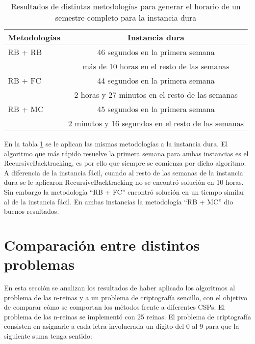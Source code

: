 \begin{table}[h]
	\caption{Resultados de distintas metodolog\'ias para generar el horario de un semestre completo para la instancia dura}
	\begin{center}
		\label{2semestre}
		\begin{tabular}{|l|c||}
			\hline \hline
			Metodolog\'ias & Instancia dura \\ \hline
			RB + RB & 46 segundos en la primera semana \\
			 &  m\'as de 10 horas en el resto de las semanas \\ \hline
			RB + FC & 44 segundos en la primera semana \\
			 & 2 horas y 27 minutos en el resto de las semanas \\ \hline
			RB + MC & 45 segundos en la primera semana \\
			 & 2 minutos y 16 segundos en el resto de las semanas \\ \hline
		\end{tabular}
	\end{center}
\end{table}

En la tabla \ref{2semestre} se le aplican las mismas metodolog\'ias a la instancia dura. El algoritmo que m\'as r\'apido resuelve la primera semana para ambas instancias es el \textsf{RecursiveBacktracking}, es por ello que siempre se comienza por dicho algoritmo. A diferencia de la instancia f\'acil, cuando al resto de las semanas de la instancia dura se le aplicaron \textsf{RecursiveBacktracking} no se encontr\'o soluci\'on en 10 horas. Sin embargo la metodolog\'ia ``RB + FC'' encontr\'o soluci\'on en un tiempo similar al de la instancia f\'acil. En ambas instancias la metodolog\'ia ``RB + MC'' dio buenos resultados.

\section{Comparaci\'on entre distintos problemas}

En esta secci\'on se analizan los resultados de haber aplicado los algoritmos al problema de las n-reinas y a un problema de criptograf\'ia sencillo, con el objetivo de comparar c\'omo se comportan los m\'etodos frente a diferentes CSPs. El problema de las n-reinas se implement\'o con 25 reinas. El problema de criptograf\'ia consisten en asignarle a cada letra involucrada un d\'igito del 0 al 9 para que la siguiente suma tenga sentido:

